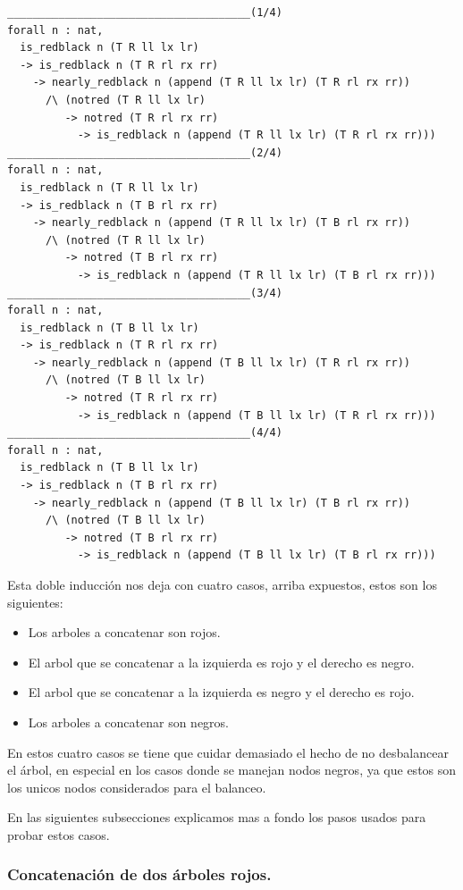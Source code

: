 \documentclass[8pt,leqno,pdflatex,spanish]{book}
\theoremstyle{plain}
\theoremstyle{definition}
\theoremstyle{remark}
\begin{document}
\begin{verbatim}
______________________________________(1/4)
forall n : nat,
  is_redblack n (T R ll lx lr)
  -> is_redblack n (T R rl rx rr)
    -> nearly_redblack n (append (T R ll lx lr) (T R rl rx rr))
      /\ (notred (T R ll lx lr)
         -> notred (T R rl rx rr)
           -> is_redblack n (append (T R ll lx lr) (T R rl rx rr)))
______________________________________(2/4)
forall n : nat,
  is_redblack n (T R ll lx lr)
  -> is_redblack n (T B rl rx rr)
    -> nearly_redblack n (append (T R ll lx lr) (T B rl rx rr))
      /\ (notred (T R ll lx lr)
         -> notred (T B rl rx rr)
           -> is_redblack n (append (T R ll lx lr) (T B rl rx rr)))
______________________________________(3/4)
forall n : nat,
  is_redblack n (T B ll lx lr)
  -> is_redblack n (T R rl rx rr)
    -> nearly_redblack n (append (T B ll lx lr) (T R rl rx rr))
      /\ (notred (T B ll lx lr)
         -> notred (T R rl rx rr)
           -> is_redblack n (append (T B ll lx lr) (T R rl rx rr)))
______________________________________(4/4)
forall n : nat,
  is_redblack n (T B ll lx lr)
  -> is_redblack n (T B rl rx rr)
    -> nearly_redblack n (append (T B ll lx lr) (T B rl rx rr))
      /\ (notred (T B ll lx lr)
         -> notred (T B rl rx rr)
           -> is_redblack n (append (T B ll lx lr) (T B rl rx rr)))
\end{verbatim}

Esta doble inducci\'on nos deja con cuatro casos, arriba expuestos, estos son los siguientes:
\begin{itemize}
    \item Los arboles a concatenar son rojos.
    \item El arbol que se concatenar a la izquierda es rojo y el derecho es negro.
    \item El arbol que se concatenar a la izquierda es negro y el derecho es rojo.
    \item Los arboles a concatenar son negros.
\end{itemize}

En estos cuatro casos se tiene que cuidar demasiado el hecho de no desbalancear el \'arbol, en 
especial en los casos donde se manejan nodos negros, ya que estos son los unicos nodos 
considerados para el balanceo.

En las siguientes subsecciones explicamos mas a fondo los pasos usados para probar estos casos.


\subsubsection{Concatenaci\'on de dos \'arboles rojos.} 
\end{document}
